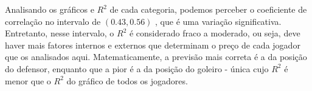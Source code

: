 \documentclass[12pt]{article}
\begin{document}
Analisando os gráficos e $R^2$ de cada categoria, podemos perceber o coeficiente de correlação no intervalo de $ (0.43, 0.56)$ , que é uma variação significativa. Entretanto, nesse intervalo, o $R^2 $ é considerado fraco a moderado, ou seja, deve haver mais fatores internos e externos que determinam o preço de cada jogador que os analisados aqui. Matematicamente, a previsão mais correta é a da posição do defensor, enquanto que a pior é a da posição do goleiro - única cujo $R^2$ é menor que o $R^2$ do gráfico de todos os jogadores.
\end{document}
